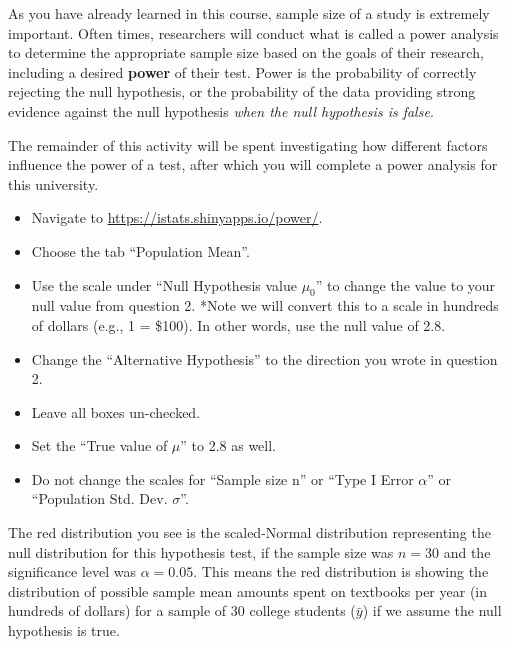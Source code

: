 \documentclass[
]{report}
\begin{document}
As you have already learned in this course, sample size of a study is extremely important. Often times, researchers will conduct what is called a power analysis to determine the appropriate sample size based on the goals of their research, including a desired \textbf{power} of their test. Power is the probability of correctly rejecting the null hypothesis, or the probability of the data providing strong evidence against the null hypothesis \emph{when the null hypothesis is false}.

The remainder of this activity will be spent investigating how different factors influence the power of a test, after which you will complete a power analysis for this university.

\begin{itemize}
\item
  Navigate to \url{https://istats.shinyapps.io/power/}.
\item
  Choose the tab ``Population Mean''.
\item
  Use the scale under ``Null Hypothesis value \(\mu_0\)'' to change the value to your null value from question 2. *Note we will convert this to a scale in hundreds of dollars (e.g., 1 = \$100). In other words, use the null value of 2.8.
\item
  Change the ``Alternative Hypothesis'' to the direction you wrote in question 2.
\item
  Leave all boxes un-checked.
\item
  Set the ``True value of \(\mu\)'' to 2.8 as well.
\item
  Do not change the scales for ``Sample size n'' or ``Type I Error \(\alpha\)'' or ``Population Std. Dev. \(\sigma\)''.
\end{itemize}

The red distribution you see is the scaled-Normal distribution representing the null distribution for this hypothesis test, if the sample size was \(n = 30\) and the significance level was \(\alpha = 0.05\). This means the red distribution is showing the distribution of possible sample mean amounts spent on textbooks per year (in hundreds of dollars) for a sample of 30 college students (\(\bar{y}\)) if we assume the null hypothesis is true.
\end{document}

